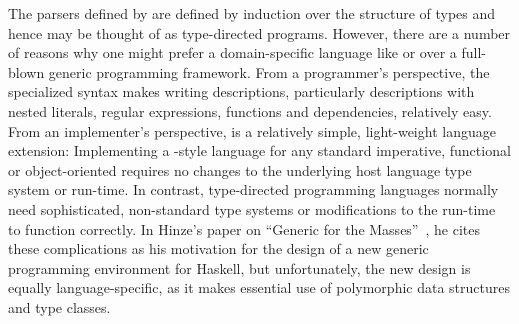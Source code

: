 The parsers defined by \ddc{} are defined by induction over the structure
of types and hence may be thought of as type-directed programs.  However,
there are a number of reasons why one might prefer a domain-specific
language like \pads{} or \ddc{} over a full-blown
generic programming framework.  
From a programmer's perspective, the specialized syntax makes writing
descriptions, particularly descriptions with nested literals, 
regular expressions, functions and dependencies, relatively easy.
From an implementer's perspective, \pads{} is a
relatively simple, light-weight language extension:  Implementing a 
\pads{}-style language for any standard imperative, functional or 
object-oriented requires no changes to the underlying host language
type system or run-time.  In contrast, type-directed
programming languages normally need sophisticated, non-standard type systems
or modifications to the run-time to function correctly.  In Hinze's
paper on ``Generic for the Masses''~\cite{hinze:masses}, he cites these
complications as his motivation for the design of a new generic programming
environment for Haskell, but unfortunately, the new design is equally 
language-specific, as it makes essential use of polymorphic data structures
and type classes.  






